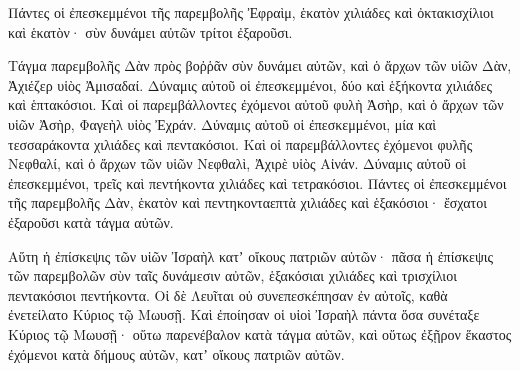 {Πάντες οἱ ἐπεσκεμμένοι τῆς παρεμβολῆς Ἐφραὶμ, ἑκατὸν χιλιάδες καὶ ὀκτακισχίλιοι καὶ ἑκατὸν· σὺν δυνάμει αὐτῶν τρίτοι ἐξαροῦσι.
\par }{\PP {}Τάγμα παρεμβολῆς Δὰν πρὸς βοῤῥᾶν σὺν δυνάμει αὐτῶν, καὶ ὁ ἄρχων τῶν υἱῶν Δὰν, Ἀχιέζερ υἱὸς Ἀμισαδαί.
Δύναμις αὐτοῦ οἱ ἐπεσκεμμένοι, δύο καὶ ἑξήκοντα χιλιάδες καὶ ἑπτακόσιοι.
Καὶ οἱ παρεμβάλλοντες ἐχόμενοι αὐτοῦ φυλὴ Ἀσὴρ, καὶ ὁ ἄρχων τῶν υἱῶν Ἀσὴρ, Φαγεὴλ υἱὸς Ἐχράν.
Δύναμις αὐτοῦ οἱ ἐπεσκεμμένοι, μία καὶ τεσσαράκοντα χιλιάδες καὶ πεντακόσιοι.
Καὶ οἱ παρεμβάλλοντες ἐχόμενοι φυλῆς Νεφθαλί, καὶ ὁ ἄρχων τῶν υἱῶν Νεφθαλὶ, Ἀχιρὲ υἱὸς Αἰνάν.
Δύναμις αὐτοῦ οἱ ἐπεσκεμμένοι, τρεῖς καὶ πεντήκοντα χιλιάδες καὶ τετρακόσιοι.
Πάντες οἱ ἐπεσκεμμένοι τῆς παρεμβολῆς Δὰν, ἑκατὸν καὶ πεντηκονταεπτὰ χιλιάδες καὶ ἑξακόσιοι· ἔσχατοι ἐξαροῦσι κατὰ τάγμα αὐτῶν.
\par }{\PP {}Αὕτη ἡ ἐπίσκεψις τῶν υἱῶν Ἰσραὴλ κατʼ οἴκους πατριῶν αὐτῶν· πᾶσα ἡ ἐπίσκεψις τῶν παρεμβολῶν σὺν ταῖς δυνάμεσιν αὐτῶν, ἑξακόσιαι χιλιάδες καὶ τρισχίλιοι πεντακόσιοι πεντήκοντα.
Οἱ δὲ Λευῖται οὐ συνεπεσκέπησαν ἐν αὐτοῖς, καθὰ ἐνετείλατο Κύριος τῷ Μωυσῇ.
Καὶ ἐποίησαν οἱ υἱοὶ Ἰσραὴλ πάντα ὅσα συνέταξε Κύριος τῷ Μωυσῇ· οὕτω παρενέβαλον κατὰ τάγμα αὐτῶν, καὶ οὕτως ἐξῇρον ἕκαστος ἐχόμενοι κατὰ δήμους αὐτῶν, κατʼ οἴκους πατριῶν αὐτῶν.

}
